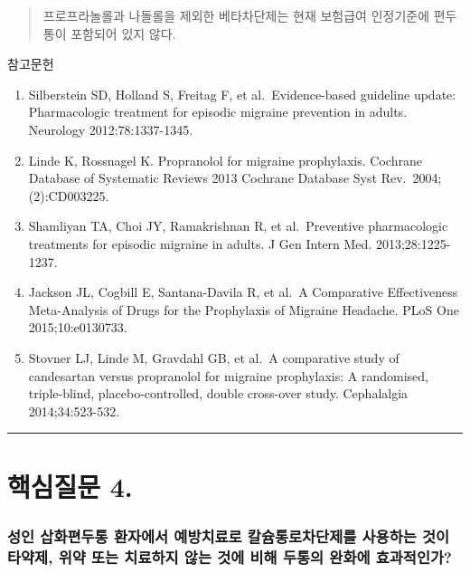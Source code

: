 \documentclass[]{book}
\begin{document}
\begin{quote}
프로프라놀롤과 나돌롤을 제외한 베타차단제는 현재 보험급여 인정기준에 편두통이 포함되어 있지 않다.
\end{quote}

참고문헌

\begin{enumerate}
\def\labelenumi{\arabic{enumi}.}
\item
  Silberstein SD, Holland S, Freitag F, et al.~Evidence-based guideline update: Pharmacologic treatment for episodic migraine prevention in adults. Neurology 2012:78:1337-1345.
\item
  Linde K, Rossnagel K. Propranolol for migraine prophylaxis. Cochrane Database of Systematic Reviews 2013 Cochrane Database Syst Rev.~2004;(2):CD003225.
\item
  Shamliyan TA, Choi JY, Ramakrishnan R, et al.~Preventive pharmacologic treatments for episodic migraine in adults. J Gen Intern Med. 2013;28:1225-1237.
\item
  Jackson JL, Cogbill E, Santana-Davila R, et al.~A Comparative Effectiveness Meta-Analysis of Drugs for the Prophylaxis of Migraine Headache. PLoS One 2015;10:e0130733.
\item
  Stovner LJ, Linde M, Gravdahl GB, et al.~A comparative study of candesartan versus propranolol for migraine prophylaxis: A randomised, triple-blind, placebo-controlled, double cross-over study. Cephalalgia 2014;34:523-532.
\end{enumerate}

\begin{center}\rule{0.5\linewidth}{\linethickness}\end{center}

\hypertarget{section-14}{%
\section{핵심질문 4.}\label{section-14}}

\hypertarget{section-15}{%
\subsubsection*{성인 삽화편두통 환자에서 예방치료로 칼슘통로차단제를 사용하는 것이 타약제, 위약 또는 치료하지 않는 것에 비해 두통의 완화에 효과적인가?}\label{section-15}}
\end{document}
